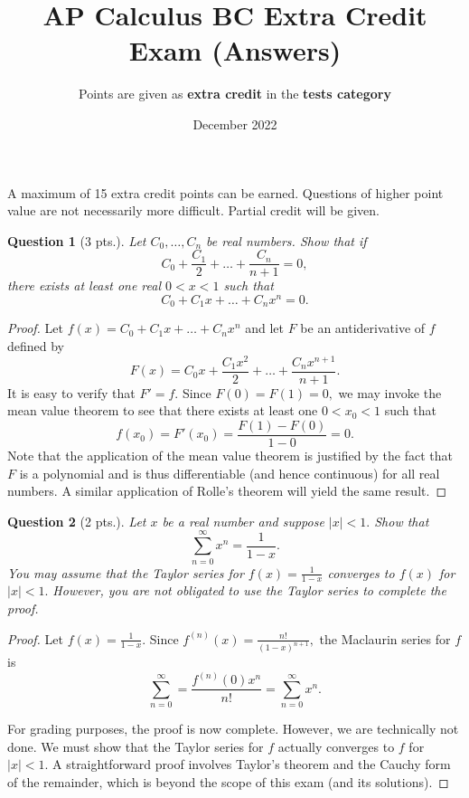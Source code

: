 \documentclass{article}
\title{AP Calculus BC Extra Credit Exam (Answers)}
\author{Points are given as \textbf{extra credit} in the \textbf{tests category}}
\date{December 2022}
\newtheorem{question}{Question}
\begin{document}
\maketitle

A maximum of 15 extra credit points can be earned. Questions of higher point value are not necessarily more difficult. Partial credit will be given.

\begin{question}[3 pts.]
Let $C_0, \dots, C_n$ be real numbers. Show that if $$C_0 + \frac{C_1} 2 + \dots + \frac{C_n}{n+1} = 0,$$ there exists at least one real $0 < x < 1$ such that $$C_0 + C_1x + \dots + C_nx^n = 0.$$ 
\end{question}

\begin{proof}
Let $f(x) = C_0 + C_1x + \dots + C_nx^n$ and let $F$ be an antiderivative of $f$ defined by $$F(x) = C_0x + \frac{C_1x^2}{2} + \dots + \frac {C_nx^{n+1}}{n + 1}.$$ It is easy to verify that $F' = f.$ Since $F(0) = F(1) = 0,$ we may invoke the mean value theorem to see that there exists at least one $0 < x_0 < 1$ such that $$f(x_0) = F'(x_0) = \frac{F(1) - F(0)}{1 - 0} = 0.$$ Note that the application of the mean value theorem is justified by the fact that $F$ is a polynomial and is thus differentiable (and hence continuous) for all real numbers. A similar application of Rolle's theorem will yield the same result.
\end{proof}

\begin{question}[2 pts.]
Let $x$ be a real number and suppose $|x| < 1.$ Show that $$\sum_{n = 0}^\infty x^n = \frac{1}{1 - x}.$$ You may assume that the Taylor series for $f(x) = \frac{1}{1-x}$ converges to $f(x)$ for $|x| < 1.$ However, you are not obligated to use the Taylor series to complete the proof.\\
\end{question}

\begin{proof}
Let $f(x) = \frac{1}{1 - x}.$ Since $f^{(n)}(x) = \frac{n!}{(1 - x)^{n + 1}},$ the Maclaurin series for $f$ is $$\sum_{n = 0}^\infty = \frac{f^{(n)}(0)x^n}{n!} = \sum_{n = 0}^\infty x^n.$$ 

For grading purposes, the proof is now complete. However, we are technically not done. We must show that the Taylor series for $f$ actually converges to $f$ for $|x| < 1$. A straightforward proof involves Taylor's theorem and the Cauchy form of the remainder, which is beyond the scope of this exam (and its solutions).
\end{proof}
\end{document}
